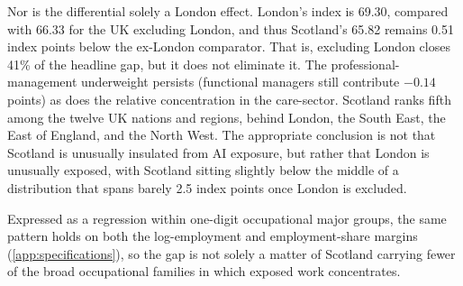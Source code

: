%
 
Nor is the differential solely a London effect. London's index is 69.30, compared with 66.33 for the UK excluding London, and thus Scotland's 65.82 remains 0.51 index points below the ex-London comparator. That is, excluding London closes 41\% of the headline gap, but it does not eliminate it. The professional-management underweight persists (functional managers still contribute $-0.14$ points) as does the relative concentration in the care-sector. Scotland ranks fifth among the twelve UK nations and regions, behind London, the South East, the East of England, and the North West. The appropriate conclusion is not that Scotland is unusually insulated from AI exposure, but rather that London is unusually exposed, with Scotland sitting slightly below the middle of a distribution that spans barely 2.5 index points once London is excluded.

Expressed as a regression within one-digit occupational major groups, the same pattern holds on both the log-employment and employment-share margins (\cref{app:specifications}), so the gap is not solely a matter of Scotland carrying fewer of the broad occupational families in which exposed work concentrates. 
 
 
